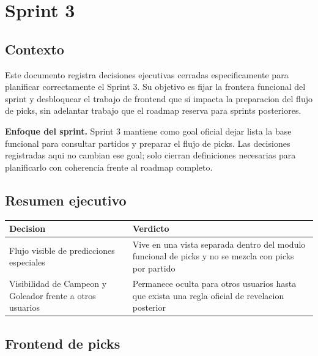 \section{Sprint 3}

\subsection{Contexto}

Este documento registra decisiones ejecutivas cerradas especificamente para planificar correctamente el Sprint 3. Su objetivo es fijar la frontera funcional del sprint y desbloquear el trabajo de frontend que si impacta la preparacion del flujo de picks, sin adelantar trabajo que el roadmap reserva para sprints posteriores.

\begin{docnote}
\textbf{Enfoque del sprint.} Sprint 3 mantiene como goal oficial dejar lista la base funcional para consultar partidos y preparar el flujo de picks. Las decisiones registradas aqui no cambian ese goal; solo cierran definiciones necesarias para planificarlo con coherencia frente al roadmap completo.
\end{docnote}

\subsection{Resumen ejecutivo}

\begin{longtable}{p{}p{}}
\toprule
\textbf{Decision} & \textbf{Verdicto} \\
\midrule
Flujo visible de predicciones especiales & Vive en una vista separada dentro del modulo funcional de picks y no se mezcla con picks por partido \\
Visibilidad de Campeon y Goleador frente a otros usuarios & Permanece oculta para otros usuarios hasta que exista una regla oficial de revelacion posterior \\
\bottomrule
\end{longtable}

\subsection{Frontend de picks}


